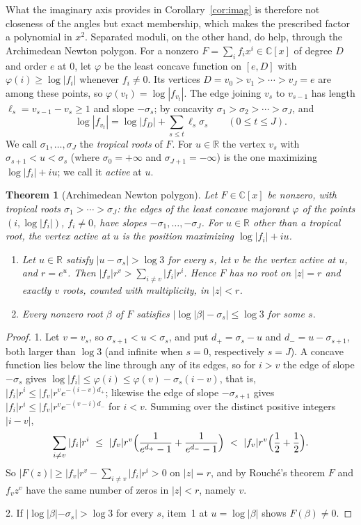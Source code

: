 \documentclass[11pt]{article}
\newtheorem{theorem}{Theorem}[section]
\newcommand{\R}{\mathbb R}
\begin{document}
What the imaginary axis provides in Corollary~\ref{cor:imag} is therefore
not closeness of the angles but exact membership, which makes the
prescribed factor a polynomial in $x^2$.  Separated moduli, on the other
hand, do help, through the Archimedean Newton polygon.  For a nonzero
$F=\sum_if_ix^i\in\mathbb C[x]$ of degree $D$ and order $e$ at $0$, let
$\varphi$ be the least concave function on $[e,D]$ with
$\varphi(i)\ge\log|f_i|$ whenever $f_i\ne0$.  Its vertices
$D=v_0>v_1>\cdots>v_J=e$ are among these points, so $\varphi(v_t)=\log|f_{v_t}|$.
The edge joining $v_s$ to $v_{s-1}$ has length $\ell_s=v_{s-1}-v_s\ge1$ and
slope $-\sigma_s$; by concavity $\sigma_1>\sigma_2>\cdots>\sigma_J$, and
\[
  \log|f_{v_t}|=\log|f_D|+\sum_{s\le t}\ell_s\sigma_s\qquad(0\le t\le J).
\]
We call $\sigma_1,\ldots,\sigma_J$ the \emph{tropical roots} of $F$.  For
$u\in\R$ the vertex $v_s$ with $\sigma_{s+1}<u<\sigma_s$ (where
$\sigma_0=+\infty$ and $\sigma_{J+1}=-\infty$) is the one maximizing
$\log|f_i|+iu$; we call it \emph{active} at $u$.

\begin{theorem}[Archimedean Newton polygon]\label{thm:archnewton}
Let $F\in\mathbb C[x]$ be nonzero, with tropical roots $\sigma_1>\cdots>\sigma_J$:
the edges of the least concave majorant $\varphi$ of the points
$(i,\log|f_i|)$, $f_i\ne0$, have slopes $-\sigma_1,\ldots,-\sigma_J$.  For
$u\in\R$ other than a tropical root, the vertex \emph{active} at $u$ is the
position maximizing $\log|f_i|+iu$.
\begin{enumerate}
\item Let $u\in\R$ satisfy $|u-\sigma_s|>\log3$ for every $s$, let $v$ be the
vertex active at $u$, and $r=e^u$.  Then
$|f_v|r^v>\sum_{i\ne v}|f_i|r^i$.  Hence $F$ has no root on $|z|=r$ and
exactly $v$ roots, counted with multiplicity, in $|z|<r$.
\item Every nonzero root $\beta$ of $F$ satisfies
$\bigl|\log|\beta|-\sigma_s\bigr|\le\log3$ for some $s$.
\end{enumerate}
\end{theorem}

\begin{proof}
1.  Let $v=v_s$, so $\sigma_{s+1}<u<\sigma_s$, and put $d_+=\sigma_s-u$ and
$d_-=u-\sigma_{s+1}$, both larger than $\log3$ (and infinite when $s=0$,
respectively $s=J$).  A concave function lies below the line through any of
its edges, so for $i>v$ the edge of slope $-\sigma_s$ gives
$\log|f_i|\le\varphi(i)\le\varphi(v)-\sigma_s(i-v)$, that is,
$|f_i|r^i\le|f_v|r^ve^{-(i-v)d_+}$; likewise the edge of slope $-\sigma_{s+1}$
gives $|f_i|r^i\le|f_v|r^ve^{-(v-i)d_-}$ for $i<v$.  Summing over the
distinct positive integers $|i-v|$,
\[
  \sum_{i\ne v}|f_i|r^i\ \le\ |f_v|r^v\Bigl(\frac1{e^{d_+}-1}+\frac1{e^{d_-}-1}\Bigr)
  \ <\ |f_v|r^v\Bigl(\frac12+\frac12\Bigr).
\]
So $|F(z)|\ge|f_v|r^v-\sum_{i\ne v}|f_i|r^i>0$ on $|z|=r$, and by Rouch\'e's
theorem $F$ and $f_vz^v$ have the same number of zeros in $|z|<r$, namely $v$.

2.  If $|\log|\beta|-\sigma_s|>\log3$ for every $s$, item~1 at
$u=\log|\beta|$ shows $F(\beta)\ne0$.
\end{proof}
\end{document}
